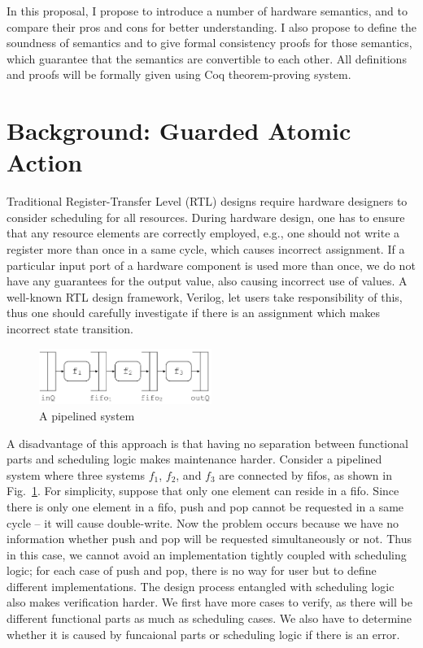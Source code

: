 In this proposal, I propose to introduce a number of hardware
semantics, and to compare their pros and cons for better
understanding. I also propose to define the soundness of semantics and
to give formal consistency proofs for those semantics, which guarantee
that the semantics are convertible to each other. All definitions and
proofs will be formally given using Coq theorem-proving system.

\section{Background: Guarded Atomic Action}\label{sec:background}
Traditional Register-Transfer Level (RTL) designs require hardware
designers to consider scheduling for all resources. During hardware
design, one has to ensure that any resource elements are correctly
employed, e.g., one should not write a register more than once in a
same cycle, which causes incorrect assignment. If a particular input
port of a hardware component is used more than once, we do not have
any guarantees for the output value, also causing incorrect use of
values. A well-known RTL design framework, Verilog, let users take
responsibility of this, thus one should carefully investigate if there
is an assignment which makes incorrect state transition.
\begin{figure}[h]
  \centering
  \includegraphics[width=0.5\textwidth]{figures/pipeline.pdf}
  \caption{A pipelined system}
  \label{fig:pipeline}
\end{figure}

A disadvantage of this approach is that having no separation between
functional parts and scheduling logic makes maintenance
harder. Consider a pipelined system where three systems $f_1$, $f_2$,
and $f_3$ are connected by fifos, as shown in
Fig.~\ref{fig:pipeline}. For simplicity, suppose that only one element
can reside in a fifo. Since there is only one element in a fifo, push
and pop cannot be requested in a same cycle -- it will cause
double-write. Now the problem occurs because we have no information
whether push and pop will be requested simultaneously or not. Thus in
this case, we cannot avoid an implementation tightly coupled with
scheduling logic; for each case of push and pop, there is no way for
user but to define different implementations. The design process
entangled with scheduling logic also makes verification harder. We
first have more cases to verify, as there will be different functional
parts as much as scheduling cases. We also have to determine whether
it is caused by funcaional parts or scheduling logic if there is an
error.

